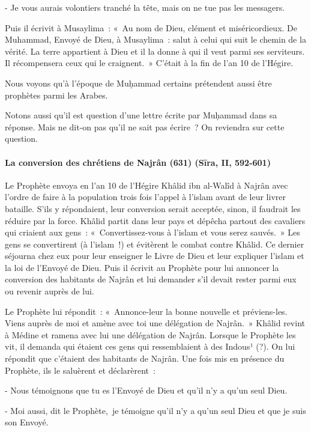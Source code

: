 {- Je vous aurais volontiers tranché la tête, mais on ne tue pas
les messagers.}

{Puis il écrivit à Musaylima~: «~Au nom de Dieu, clément et
miséricordieux. De Muhammad, Envoyé de Dieu, à Musaylima~: salut à celui
qui suit le chemin de la vérité. La terre appartient à Dieu et il la
donne à qui il veut parmi ses serviteurs. Il récompensera ceux qui le
craignent.~» C'était à la fin de l'an 10 de l'Hégire.}

Nous voyons qu'à l'époque de Muḥammad certains prétendent aussi être
prophètes parmi les Arabes.

Notons aussi qu'il est question d'une lettre écrite par Muḥammad dans sa
réponse. Mais ne dit-on pas qu'il ne sait pas écrire~? On reviendra sur
cette question.


\paragraph{La conversion des chrétiens de Najrân (631) (Sīra, II,
592-601)}

{Le Prophète envoya en l'an 10 de l'Hégire Khâlid ibn al-Walîd à
Najrân avec l'ordre de faire à la population trois fois l'appel à
l'islam avant de leur livrer bataille. S'ils y répondaient, leur
conversion serait acceptée, sinon, il faudrait les réduire par la force.
Khâlid partit dans leur pays et dépêcha partout des cavaliers qui
criaient aux gens~: «~Convertissez-vous à l'islam et vous serez
sauvés.~» Les gens se convertirent (à l'islam~!) et évitèrent le combat
contre Khâlid. Ce dernier séjourna chez eux pour leur enseigner le Livre
de Dieu et leur expliquer l'islam et la loi de l'Envoyé de Dieu. Puis il
écrivit au Prophète pour lui annoncer la conversion des habitants de
Najrân et lui demander s'il devait rester parmi eux ou revenir auprès de
lui.}

{Le Prophète lui répondit~: «~Annonce-leur la bonne nouvelle et
préviens-les. Viens auprès de moi et amène avec toi une délégation de
Najrân.~» Khâlid revint à Médine et ramena avec lui une délégation de
Najrân. Lorsque le Prophète les vit, il demanda qui étaient ces gens qui
ressemblaient à des Indous¹ (?). On lui répondit que c'étaient des
habitants de Najrân. Une fois mis en présence du Prophète, ils le
saluèrent et déclarèrent~:}

{- Nous témoignons que tu es l'Envoyé de Dieu et qu'il n'y a qu'un
seul Dieu.}

{- Moi aussi, dit le Prophète,~je témoigne qu'il n'y a qu'un seul
Dieu et que je suis son Envoyé.}


